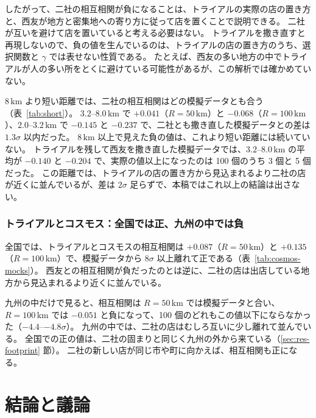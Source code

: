 \documentclass[a4paper,11pt]{ltjsarticle}
\begin{document}
したがって、二社の相互相関が負になることは、トライアルの実際の店の置き方と、西友が地方と密集地への寄り方に従って店を置くことで説明できる。
二社が互いを避けて店を置いていると考える必要はない。
トライアルを撒き直すと再現しないので、負の値を生んでいるのは、トライアルの店の置き方のうち、選択関数と $\gamma$ では表せない性質である。
たとえば、西友の多い地方の中でトライアルが人の多い所をとくに避けている可能性があるが、この解析では確かめていない。

$8\,\mathrm{km}$ より短い距離では、二社の相互相関はどの模擬データとも合う（表~\ref{tab:short}）。
$3.2$--$8.0\,\mathrm{km}$ で $+0.041$（$R = 50\,\mathrm{km}$）と $-0.068$（$R = 100\,\mathrm{km}$）、$2.0$--$3.2\,\mathrm{km}$ で $-0.145$ と $-0.237$ で、二社とも撒き直した模擬データとの差は $1.3\sigma$ 以内だった。
$8\,\mathrm{km}$ 以上で見えた負の値は、これより短い距離には続いていない。
トライアルを残して西友を撒き直した模擬データでは、$3.2$--$8.0\,\mathrm{km}$ の平均が $-0.140$ と $-0.204$ で、実際の値以上になったのは 100 個のうち 3 個と 5 個だった。
この距離では、トライアルの店の置き方から見込まれるより二社の店が近くに並んでいるが、差は $2\sigma$ 足らずで、本稿ではこれ以上の結論は出さない。

\subsubsection{トライアルとコスモス：全国では正、九州の中では負}

全国では、トライアルとコスモスの相互相関は $+0.087$（$R = 50\,\mathrm{km}$）と $+0.135$（$R = 100\,\mathrm{km}$）で、模擬データから $8\sigma$ 以上離れて正である（表~\ref{tab:cosmos-mocks}）。
西友との相互相関が負だったのとは逆に、二社の店は出店している地方から見込まれるより近くに並んでいる。

九州の中だけで見ると、相互相関は $R = 50\,\mathrm{km}$ では模擬データと合い、$R = 100\,\mathrm{km}$ では $-0.051$ と負になって、100 個のどれもこの値以下にならなかった（$-4.4$--$-4.8\sigma$）。
九州の中では、二社の店はむしろ互いに少し離れて並んでいる。
全国での正の値は、二社の固まりと同じく九州の外から来ている（\ref{sec:res-footprint} 節）。
二社の新しい店が同じ市や町に向かえば、相互相関も正になる。

\section{結論と議論}
\label{sec:conclusion}
\end{document}
